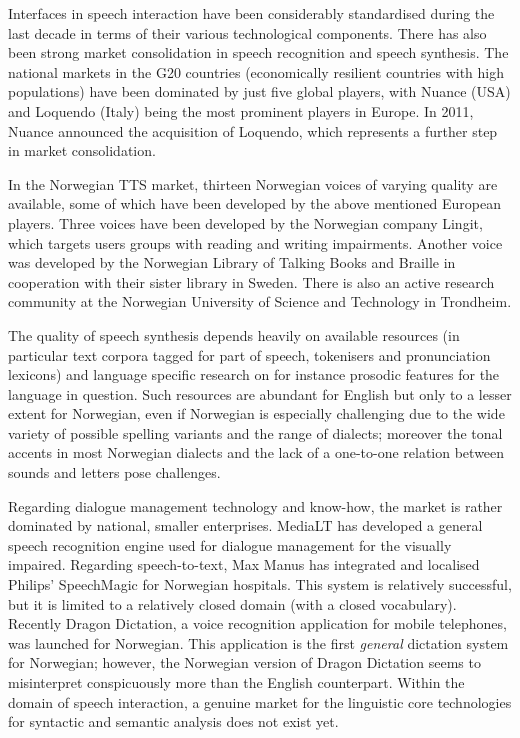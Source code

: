\begin{multicols}{2}
Interfaces in speech interaction have been considerably standardised during the last decade in terms of their various technological components. There has also been strong market consolidation in speech recognition and speech synthesis. The national markets in the G20 countries (economically resilient countries with high populations) have been dominated by just five global players, with Nuance (USA) and Loquendo (Italy) being the most prominent players in Europe. In 2011, Nuance announced the acquisition of Loquendo, which represents a further step in market consolidation.

In the Norwegian TTS market, thirteen Norwegian voices of varying quality are available, some of which have been developed by the above mentioned European players. 
Three voices have been developed by the Norwegian company Lingit, which targets users groups with reading and writing impairments. 
Another voice was developed by the Norwegian Library of Talking Books and Braille in cooperation with their sister library in Sweden. 
There is also an active research community at the Norwegian University of Science and Technology in Trondheim. 


The quality of speech synthesis depends heavily on available resources (in particular text corpora tagged for part of speech, tokenisers and pronunciation lexicons) and language specific research on for instance prosodic features for the language in question. 
Such resources are abundant for English but only to a lesser extent for Norwegian, even if Norwegian is especially challenging due to the wide variety of possible spelling variants and the range of dialects; moreover the tonal accents in most Norwegian dialects and the lack of a one-to-one relation between sounds and letters pose challenges.

Regarding dialogue management technology and know-how, the market is rather dominated by national, smaller enterprises. 
MediaLT has developed a general speech recognition engine used for dialogue management for the visually impaired. 
Regarding speech-to-text, Max Manus has integrated and localised Philips’ SpeechMagic for Norwegian hospitals. 
This system is relatively successful, but it is limited to a relatively closed domain (with a closed vocabulary). 
Recently Dragon Dictation, a voice recognition application for mobile telephones, was launched for Norwegian. 
This application is the first \textit{general} dictation system for Norwegian; however, the Norwegian version of Dragon Dictation seems to misinterpret conspicuously more than the English counterpart.
Within the domain of speech interaction, a genuine market for the linguistic core technologies for syntactic and semantic analysis does not exist yet.


\end{multicols}
